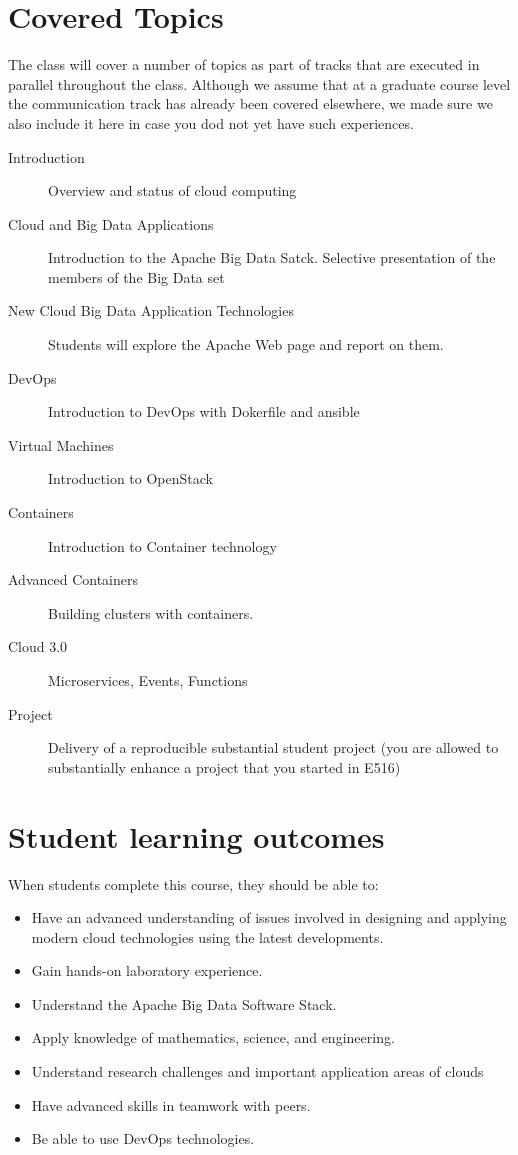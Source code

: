\begin{itemize}
\section{Covered Topics}

The class will cover a number of topics as part of tracks that are
executed in parallel throughout the class. Although we assume that at
a graduate course level the communication track has already been
covered elsewhere, we made sure we also include it here in case you dod
not yet have such experiences.

\begin{description}

\item[Introduction] Overview and status of cloud computing
\item[Cloud and Big Data Applications] Introduction to the Apache Big
  Data Satck. Selective presentation of the members of the Big Data
  set
\item[New Cloud Big Data Application Technologies] Students will
  explore the Apache Web page and report on them.
\item[DevOps] Introduction to DevOps with Dokerfile and ansible
\item[Virtual Machines] Introduction to OpenStack
\item[Containers] Introduction to Container technology
\item[Advanced Containers] Building clusters with containers.
\item[Cloud 3.0] Microservices, Events, Functions  
\item[Project] Delivery of a reproducible substantial student project
  (you are allowed to substantially enhance a project that you started
  in E516)

\end{description}

\section{Student learning outcomes}

When students complete this course, they should be able to:

\begin{itemize}
\item Have an advanced understanding of issues involved in designing
  and applying modern cloud technologies using the latest
  developments.
\item	Gain hands-on laboratory experience.
\item	Understand the Apache Big Data Software Stack.
\item	Apply knowledge of mathematics, science, and engineering.
\item Understand research challenges and important application areas
  of clouds
\item	Have advanced skills in teamwork with peers.
\item Be able to use DevOps technologies.
\end{itemize}


\end{itemize}
